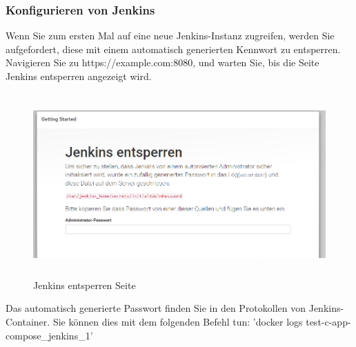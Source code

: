 \documentclass[a4paper,12pt,oneside]{book}
\begin{document}
\subsubsection{Konfigurieren von Jenkins}
Wenn Sie zum ersten Mal auf eine neue Jenkins-Instanz zugreifen, werden Sie aufgefordert, diese mit einem automatisch generierten Kennwort zu entsperren.
Navigieren Sie zu https://example.com:8080, und warten Sie, bis die Seite Jenkins entsperren angezeigt wird.
\begin{figure}[h!]
	\begin{center}
		\includegraphics[width=17cm, height=7cm]{Jenkins-entsperren-seite.PNG}
		\caption{Jenkins entsperren Seite} 
		\label{Jenkins entsperren Seite} 
	\end{center}
\end{figure}
\newline
Das automatisch generierte Passwort finden Sie in den Protokollen von Jenkins-Container. Sie können dies mit dem folgenden Befehl tun: 'docker logs test-c-app-compose_jenkins_1'
\end{document}
